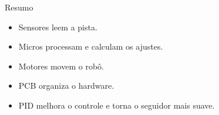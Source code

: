 \documentclass[10pt]{beamer}
\begin{document}
\begin{frame}{Resumo}
  \begin{itemize}
    \item Sensores leem a pista.
    \item Micros processam e calculam os ajustes.
    \item Motores movem o robô.
    \item PCB organiza o hardware.
    \item PID melhora o controle e torna o seguidor mais suave.
  \end{itemize}
\end{frame}
\end{document}
